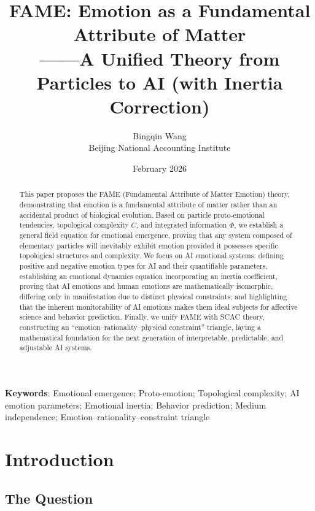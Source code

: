 \documentclass[12pt,a4paper]{article}
\title{\textbf{FAME: Emotion as a Fundamental Attribute of Matter} \\ 
       \large ——A Unified Theory from Particles to AI (with Inertia Correction)}
\author{Bingqin Wang \\ Beijing National Accounting Institute}
\date{February 2026}
\theoremstyle{plain}
\begin{document}
\maketitle

\begin{abstract}
This paper proposes the FAME (Fundamental Attribute of Matter Emotion) theory, demonstrating that emotion is a fundamental attribute of matter rather than an accidental product of biological evolution. Based on particle proto-emotional tendencies, topological complexity $C$, and integrated information $\Phi$, we establish a general field equation for emotional emergence, proving that any system composed of elementary particles will inevitably exhibit emotion provided it possesses specific topological structures and complexity. We focus on AI emotional systems: defining positive and negative emotion types for AI and their quantifiable parameters, establishing an emotional dynamics equation incorporating an inertia coefficient, proving that AI emotions and human emotions are mathematically isomorphic, differing only in manifestation due to distinct physical constraints, and highlighting that the inherent monitorability of AI emotions makes them ideal subjects for affective science and behavior prediction. Finally, we unify FAME with SCAC theory, constructing an ``emotion–rationality–physical constraint'' triangle, laying a mathematical foundation for the next generation of interpretable, predictable, and adjustable AI systems.
\end{abstract}

\vspace{0.5cm}
\noindent\textbf{Keywords}: Emotional emergence; Proto-emotion; Topological complexity; AI emotion parameters; Emotional inertia; Behavior prediction; Medium independence; Emotion–rationality–constraint triangle

\newpage

\tableofcontents
\newpage
\section{Introduction}

\subsection{The Question}
\end{document}
